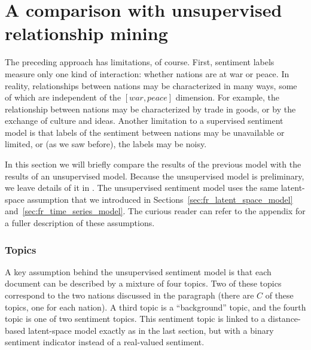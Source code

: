 \section{A comparison with unsupervised relationship mining}


The preceding approach has limitations, of course.  First, sentiment
labels measure only one kind of interaction: whether nations are at
war or peace.  In reality, relationships between nations may be
characterized in many ways, some of which are independent of the $[
war, peace ]$ dimension.  For example, the relationship between
nations may be characterized by trade in goods, or by the exchange of
culture and ideas.  Another limitation to a supervised sentiment model
is that labels of the sentiment between nations may be unavailable
or limited, or (as we saw before), the labels may be noisy.

In this section we will briefly compare the results of the previous
model with the results of an unsupervised model.  Because the
unsupervised model is preliminary, we leave details of it in
.  The unsupervised sentiment model
uses the same latent-space assumption that we introduced in
Sections~\ref{sec:fr_latent_space_model}
and~\ref{sec:fr_time_series_model}.  The curious reader can refer to
the appendix for a fuller description of these assumptions.

\subsubsection*{Topics}
A key assumption behind the unsupervised sentiment model is that each
document can be described by a mixture of four topics.  Two of these
topics correspond to the two nations discussed in the paragraph (there
are $C$ of these topics, one for each nation).  A third topic is a
``background'' topic, and the fourth topic is one of two sentiment
topics.  This sentiment topic is linked to a distance-based
latent-space model exactly as in the last section, but with a binary
sentiment indicator instead of a real-valued sentiment.

